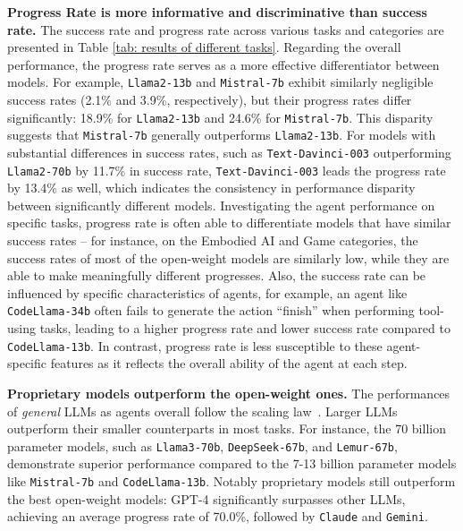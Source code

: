 \textbf{Progress Rate is more informative and discriminative than success rate. }
The success rate and progress rate across various tasks and categories are presented in Table \ref{tab: results of different tasks}. Regarding the overall performance, the progress rate serves as a more effective differentiator between models. For example, \texttt{Llama2-13b} and \texttt{Mistral-7b} exhibit similarly negligible success rates (2.1\% and 3.9\%, respectively), but their progress rates differ significantly: 18.9\% for \texttt{Llama2-13b} and 24.6\% for \texttt{Mistral-7b}. This disparity suggests that \texttt{Mistral-7b} generally outperforms \texttt{Llama2-13b}. For models with substantial differences in success rates, such as \texttt{Text-Davinci-003} outperforming \texttt{Llama2-70b} by 11.7\% in success rate, \texttt{Text-Davinci-003} leads the progress rate by 13.4\% as well, which indicates the consistency in performance disparity between significantly different models. 
Investigating the agent performance on specific tasks, progress rate is often able to differentiate models that have similar success rates -- for instance, on the Embodied AI and Game categories, the success rates of most of the open-weight models are similarly low, while they are able to make meaningfully different progresses.
Also, the success rate can be influenced by specific characteristics of agents, for example, an agent like \texttt{CodeLlama-34b} often fails to generate the action ``finish'' when performing tool-using tasks, leading to a higher progress rate and lower success rate compared to \texttt{CodeLlama-13b}. In contrast, progress rate is less susceptible to these agent-specific features as it reflects the overall ability of the agent at each step.

\textbf{Proprietary models outperform the open-weight ones.} The performances of \textit{general} LLMs as agents overall follow the scaling law~\citep{kaplan2020scaling}. Larger LLMs outperform their smaller counterparts in most tasks. For instance, the 70 billion parameter models, such as \texttt{Llama3-70b}, \texttt{DeepSeek-67b}, and \texttt{Lemur-67b}, demonstrate superior performance compared to the 7-13 billion parameter models like \texttt{Mistral-7b} and \texttt{CodeLlama-13b}. Notably proprietary models still outperform the best open-weight models: GPT-4 significantly surpasses other LLMs, achieving an average progress rate of 70.0\%, followed by \texttt{Claude} and \texttt{Gemini}. 


